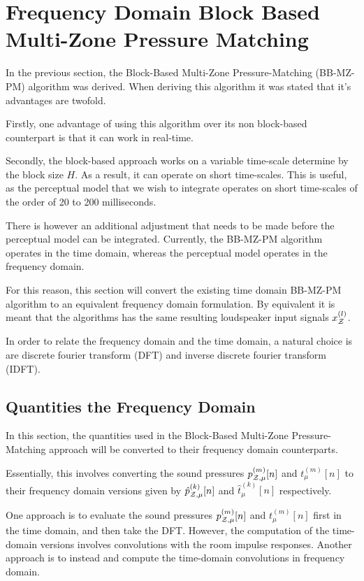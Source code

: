 \section{Frequency Domain Block Based Multi-Zone Pressure Matching}
In the previous section, the Block-Based Multi-Zone Pressure-Matching (BB-MZ-PM) algorithm was derived.
When deriving this algorithm it was stated that it's advantages are twofold.

Firstly, one advantage of using this algorithm over its non block-based counterpart is that it can work in real-time.

Secondly, the block-based approach works on a variable time-scale determine by the block size $H$.
As a result, it can operate on short time-scales.
This is useful, as the perceptual model that we wish to integrate operates on short time-scales of the order of 20 to 200 milliseconds.

There is however an additional adjustment that needs to be made before the perceptual model can be integrated. 
Currently, the BB-MZ-PM algorithm operates in the time domain, whereas the perceptual model operates in the frequency domain.

For this reason, this section will convert the existing time domain BB-MZ-PM algorithm to an equivalent frequency domain formulation.
By equivalent it is meant that the algorithms has the same resulting loudspeaker input signals $x_{\mathcal{Z}}^{(l)}$.

In order to relate the frequency domain and the time domain, a natural choice is are discrete fourier transform (DFT) and inverse discrete fourier transform (IDFT).

\subsection{Quantities the Frequency Domain}
In this section, the quantities used in the Block-Based Multi-Zone Pressure-Matching approach will be converted to their frequency domain counterparts.

Essentially, this involves converting the sound pressures $p_{\mathcal{Z},\mu}^{(m)}[n]$ and $t_\mu^{(m)}[n]$ to their frequency domain versions given by 
$\hat{p}_{\mathcal{Z},\mu}^{(k)}[n]$ and $\hat{t}_\mu^{(k)}[n]$ respectively.

One approach is to evaluate the sound pressures $p_{\mathcal{Z},\mu}^{(m)}[n]$ and $t_\mu^{(m)}[n]$ first in the time domain, and then take the DFT.
However, the computation of the time-domain versions involves convolutions with the room impulse responses.
Another approach is to instead and compute the time-domain convolutions in frequency domain.

